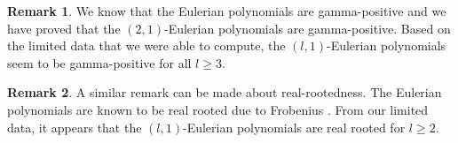 \documentclass{article}
\newcommand{\N}{\mathbb{N}}
\theoremstyle{definition}
\newtheorem*{remark}{Remark}
\numberwithin{equation}{section}
\begin{document}
\begin{remark}
We know that the Eulerian polynomials are gamma-positive and we have proved that the $(2,1)$-Eulerian polynomials are gamma-positive.
    Based on the limited data that we were able to compute, the $(l,1)$-Eulerian polynomials seem to be gamma-positive for all $l\ge 3$.
\end{remark}

\begin{remark}
    A similar remark can be made about real-rootedness. The Eulerian polynomials are known to be real rooted due to Frobenius \cite{frobenius-real-root-eulerian}. From our limited data, it appears that the $(l,1)$-Eulerian polynomials are real rooted for $l\ge 2$. 
\end{remark}
% 
\end{document}
